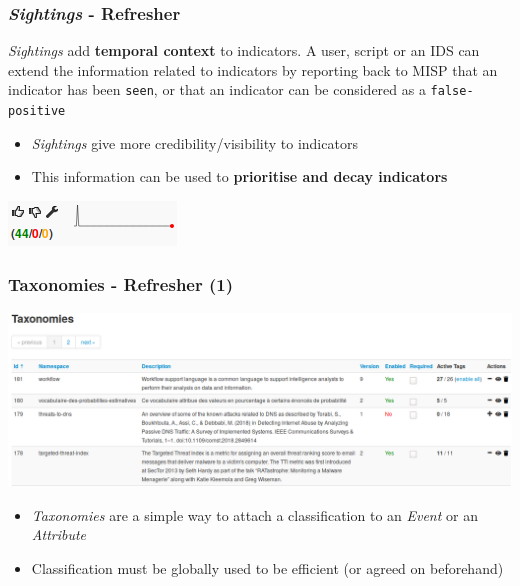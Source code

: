 \begin{frame}
    \frametitle{\textit{Sightings} - Refresher}
    \textit{Sightings} add \textbf{temporal context} to indicators.
    A user, script or an IDS can extend the information related to indicators by reporting back to MISP that
    an indicator has been \texttt{seen}, or that an indicator can be considered as a \texttt{false-positive}
    \vspace{0.5cm}
    \begin{itemize}
        \item \textit{Sightings} give more credibility/visibility to indicators
        \item This information can be used to {\bf prioritise and decay indicators}
    \end{itemize}
    \begin{center}
        \includegraphics[scale=1.00]{pics/sightings.png}
    \end{center}
\end{frame}

\begin{frame}
    \frametitle{Taxonomies - Refresher (1)}
    \includegraphics[width=1.00\linewidth]{pics/taxonomies.png}
    \begin{itemize}
        \item \textit{Taxonomies} are a simple way to attach a classification to an \textit{Event} or an \textit{Attribute}
        \item Classification must be globally used to be efficient (or agreed on beforehand)
    \end{itemize}
\end{frame}

